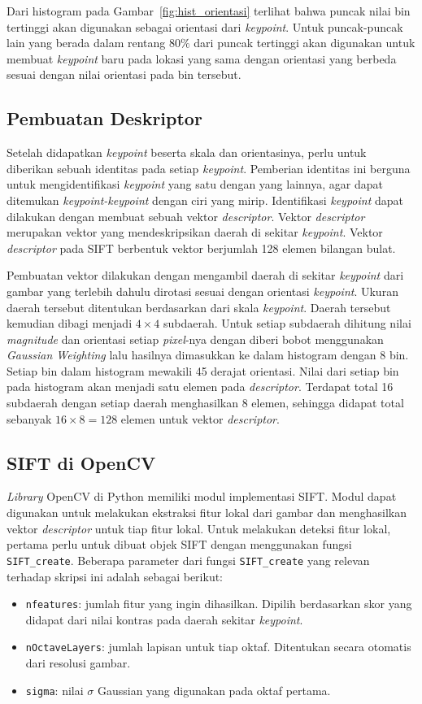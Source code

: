 Dari histogram pada Gambar~\ref{fig:hist_orientasi} terlihat bahwa puncak nilai bin tertinggi akan digunakan sebagai orientasi dari \textit{keypoint}. Untuk puncak-puncak lain yang berada dalam rentang $80\%$ dari puncak tertinggi akan digunakan untuk membuat \textit{keypoint} baru pada lokasi yang sama dengan orientasi yang berbeda sesuai dengan nilai orientasi pada bin tersebut.

\subsection{Pembuatan Deskriptor}
Setelah didapatkan \textit{keypoint} beserta skala dan orientasinya, perlu untuk diberikan sebuah identitas pada setiap \textit{keypoint}. Pemberian identitas ini berguna untuk mengidentifikasi \textit{keypoint} yang satu dengan yang lainnya, agar dapat ditemukan \textit{keypoint-keypoint} dengan ciri yang mirip. Identifikasi \textit{keypoint} dapat dilakukan dengan membuat sebuah vektor \textit{descriptor}. Vektor \textit{descriptor} merupakan vektor yang mendeskripsikan daerah di sekitar \textit{keypoint}. Vektor \textit{descriptor} pada SIFT berbentuk vektor berjumlah 128 elemen bilangan bulat.

Pembuatan vektor dilakukan dengan mengambil daerah di sekitar \textit{keypoint} dari gambar yang terlebih dahulu dirotasi sesuai dengan orientasi \textit{keypoint}. Ukuran daerah tersebut ditentukan berdasarkan dari skala \textit{keypoint}. Daerah tersebut kemudian dibagi menjadi $4\times4$ subdaerah. Untuk setiap subdaerah dihitung nilai \textit{magnitude} dan orientasi setiap \textit{pixel}-nya dengan diberi bobot menggunakan \textit{Gaussian Weighting} lalu hasilnya dimasukkan ke dalam histogram dengan 8 bin. Setiap bin dalam histogram mewakili 45 derajat orientasi. Nilai dari setiap bin pada histogram akan menjadi satu elemen pada \textit{descriptor}. Terdapat total 16 subdaerah dengan setiap daerah menghasilkan 8 elemen, sehingga didapat total sebanyak $16\times8=128$ elemen untuk vektor \textit{descriptor}. 

\subsection{SIFT di OpenCV}
\textit{Library} OpenCV di Python memiliki modul implementasi SIFT. Modul dapat digunakan untuk melakukan ekstraksi fitur lokal dari gambar dan menghasilkan vektor \textit{descriptor} untuk tiap fitur lokal. Untuk melakukan deteksi fitur lokal, pertama perlu untuk dibuat objek SIFT dengan menggunakan fungsi \texttt{SIFT\_create}. Beberapa parameter dari fungsi \texttt{SIFT\_create} yang relevan terhadap skripsi ini adalah sebagai berikut:
\begin{itemize}
	\item \texttt{nfeatures}: jumlah fitur yang ingin dihasilkan. Dipilih berdasarkan skor yang didapat dari nilai kontras pada daerah sekitar \textit{keypoint}.
	\item \texttt{nOctaveLayers}: jumlah lapisan untuk tiap oktaf. Ditentukan secara otomatis dari resolusi gambar.
	\item \texttt{sigma}: nilai $\sigma$ Gaussian yang digunakan pada oktaf pertama.
\end{itemize}


